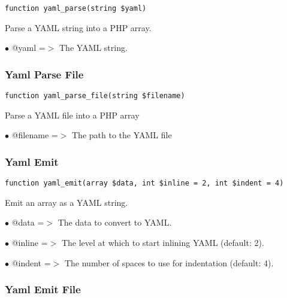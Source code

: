 \documentclass[a4paper]{article}
\begin{document}
\begin{lstlisting}
function yaml_parse(string $yaml)
\end{lstlisting}

Parse a YAML string into a PHP array.

\begin{compactitem}
\item[\color{myblue}$\bullet$] @yaml =$>$ The YAML string.
\end{compactitem}

\hypertarget{toc287}{}
\subsubsection{Yaml Parse File}

\begin{lstlisting}
function yaml_parse_file(string $filename)
\end{lstlisting}

Parse a YAML file into a PHP array

\begin{compactitem}
\item[\color{myblue}$\bullet$] @filename =$>$ The path to the YAML file
\end{compactitem}

\hypertarget{toc288}{}
\subsubsection{Yaml Emit}

\begin{lstlisting}
function yaml_emit(array $data, int $inline = 2, int $indent = 4)
\end{lstlisting}

Emit an array as a YAML string.

\begin{compactitem}
\item[\color{myblue}$\bullet$] @data   =$>$ The data to convert to YAML.
\item[\color{myblue}$\bullet$] @inline =$>$ The level at which to start inlining YAML (default: 2).
\item[\color{myblue}$\bullet$] @indent =$>$ The number of spaces to use for indentation (default: 4).
\end{compactitem}

\hypertarget{toc289}{}
\subsubsection{Yaml Emit File}
\end{document}
